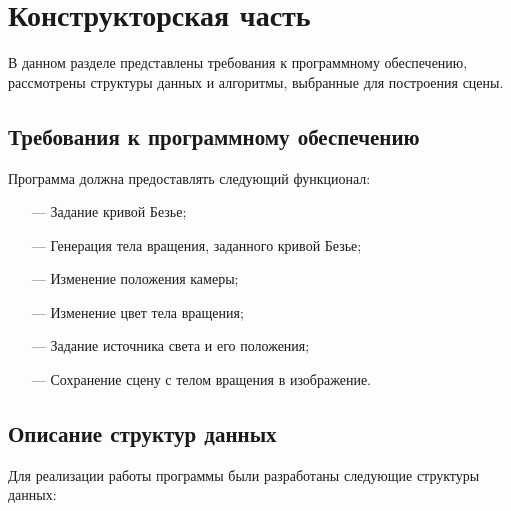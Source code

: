 \chapter{Конструкторская часть}

В данном разделе представлены требования к программному обеспечению, рассмотрены структуры данных и алгоритмы, выбранные для построения сцены.

\section{Требования к программному обеспечению}

Программа должна предоставлять следующий функционал:

\begin{itemize}
    \item[---] Задание кривой Безье;
    \item[---] Генерация тела вращения, заданного кривой Безье;
    \item[---] Изменение положения камеры;
    \item[---] Изменение цвет тела вращения;
    \item[---] Задание источника света и его положения;
    \item[---] Сохранение сцену с телом вращения в изображение.
\end{itemize}

\section{Описание структур данных}

Для реализации работы программы были разработаны следующие структуры данных:

